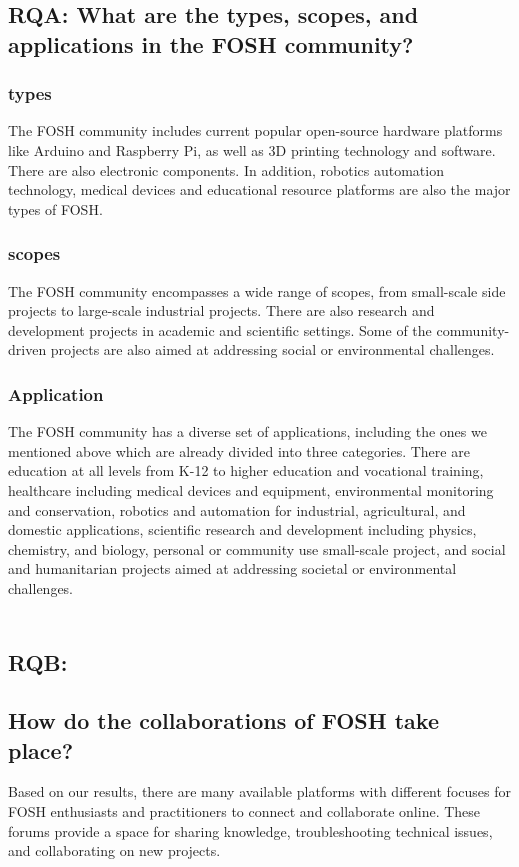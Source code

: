 \documentclass[final-report.tex]{subfiles}
\begin{document}
\subsection{RQA: What are the types, scopes, and applications in the FOSH community?}

\subsubsection{types} 
The FOSH community includes current popular open-source hardware platforms like Arduino and Raspberry Pi, as well as 3D printing technology and software. There are also electronic components. In addition, robotics automation technology, medical devices and educational resource platforms are also the major types of FOSH.

\subsubsection{scopes}
The FOSH community encompasses a wide range of scopes, from small-scale side projects to large-scale industrial projects. There are also research and development projects in academic and scientific settings. Some of the community-driven projects are also aimed at addressing social or environmental challenges.

\subsubsection{Application}
The FOSH community has a diverse set of applications, including the ones we mentioned above which are already divided into three categories. There are education at all levels from K-12 to higher education and vocational training, healthcare including medical devices and equipment, environmental monitoring and conservation, robotics and automation for industrial, agricultural, and domestic applications, scientific research and development including physics, chemistry, and biology, personal or community use small-scale project, and social and humanitarian projects aimed at addressing societal or environmental challenges.
\\\\
\subsection{RQB: }

\subsection{How do the collaborations of FOSH take place?}
Based on our results, there are many available platforms with different focuses for FOSH enthusiasts and practitioners to connect and collaborate online. These forums provide a space for sharing knowledge, troubleshooting technical issues, and collaborating on new projects.
\end{document}
